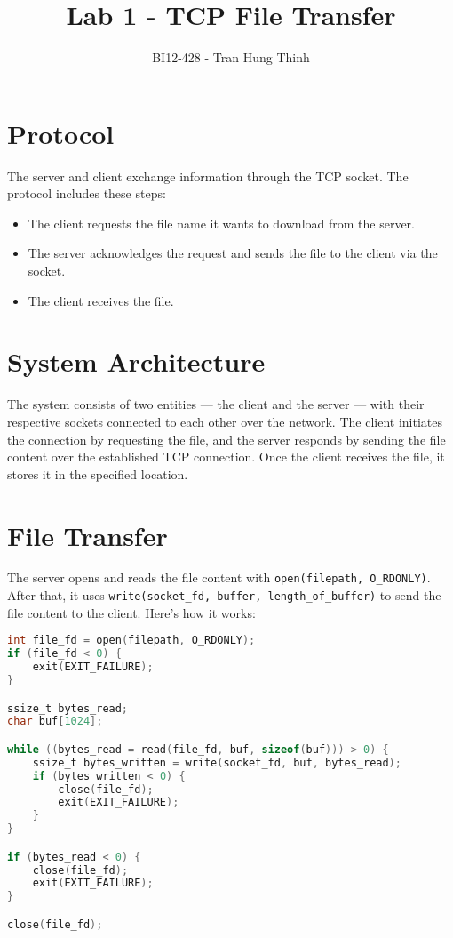 \documentclass[a4paper,12pt]{article}
\title{Lab 1 - TCP File Transfer}
\author{BI12-428 - Tran Hung Thinh}
\begin{document}
\maketitle

\section{Protocol}
The server and client exchange information through the TCP socket. The protocol includes these steps:
\begin{itemize}
    \item The client requests the file name it wants to download from the server.
    \item The server acknowledges the request and sends the file to the client via the socket.
    \item The client receives the file.
\end{itemize}

\section{System Architecture}
The system consists of two entities — the client and the server — with their respective sockets connected to each other over the network. The client initiates the connection by requesting the file, and the server responds by sending the file content over the established TCP connection. Once the client receives the file, it stores it in the specified location.

\section{File Transfer}
The server opens and reads the file content with \texttt{open(filepath, O\_RDONLY)}. After that, it uses \texttt{write(socket\_fd, buffer, length\_of\_buffer)} to send the file content to the client. Here's how it works:

\begin{lstlisting}[language=C]
int file_fd = open(filepath, O_RDONLY);
if (file_fd < 0) {
    exit(EXIT_FAILURE);
}

ssize_t bytes_read;
char buf[1024];

while ((bytes_read = read(file_fd, buf, sizeof(buf))) > 0) {
    ssize_t bytes_written = write(socket_fd, buf, bytes_read);
    if (bytes_written < 0) {
        close(file_fd);
        exit(EXIT_FAILURE);
    }
}

if (bytes_read < 0) {
    close(file_fd);
    exit(EXIT_FAILURE);
}

close(file_fd);
\end{lstlisting}
\end{document}
